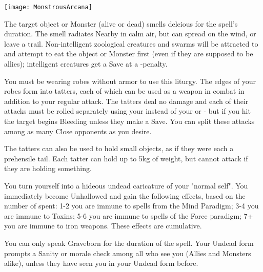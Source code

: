 {  \begin{center}
  \texttt{[image: MonstrousArcana]}
  \end{center}


\MYSTERY [
  Name = Tasty,
  Link = arcana-mystery-tasty,
  Paradigm = Biomancy,
  Save = N,
  Duration = Combat or \SUM Minutes,
  Target = Close Target(s)
]

The target object or Monster (alive or dead) smells delcious for the spell's duration.  The smell radiates Nearby in calm air, but can spread on the wind, or leave a trail.  Non-intelligent zoological creatures and swarms will be attracted to and attempt to eat the object or Monster first (even if they are supposed to be allies); intelligent creatures get a Save at a -\DICE penalty. 

\MYSTERY [
  Name = Tattered Robe,
  Link = arcana-mystery-tattered-robe,
  Paradigm = Entropy,
  Save = Y (neg.),
  Duration = Combat or \SUM Minutes,
  Target = Self
]

You must be wearing robes without armor to use this liturgy.  The edges of your robes form into \DICE tatters, each of which can be used as a weapon in combat in addition to your regular attack. The tatters deal no damage and each of their attacks must be rolled separately using your \FOC instead of your \VIG or \DEX - but if you hit the target begins Bleeding unless they make a Save.  You can split these attacks among as many Close opponents as you desire.

The tatters can also be used to hold small objects, as if they were each a prehensile tail.  Each tatter can hold up to 5kg of weight, but cannot attack if they are holding something.

\MYSTERY [
  Name = Undead Visage,
  Link = arcana-mystery-undead-visage,
  Paradigm = Death,
  Save = n/a,
  Duration = Combat or \SUM Minutes,
  Target = Self
]

You turn yourself into a hideous undead caricature of your "normal self".  You immediately become Unhallowed and gain the following effects, based on the number of \DICE spent:  1-2 you are immune to spells from the Mind Paradigm; 3-4 you are immune to Toxins; 5-6 you are immune to spells of the Force paradigm; 7+  you are immune to iron weapons.  These effects are cumulative.

You can only speak Graveborn for the duration of the spell.  Your Undead form prompts a Sanity or morale check among all who see you (Allies and Monsters alike), unless they have seen you in your Undead form before. 


}
